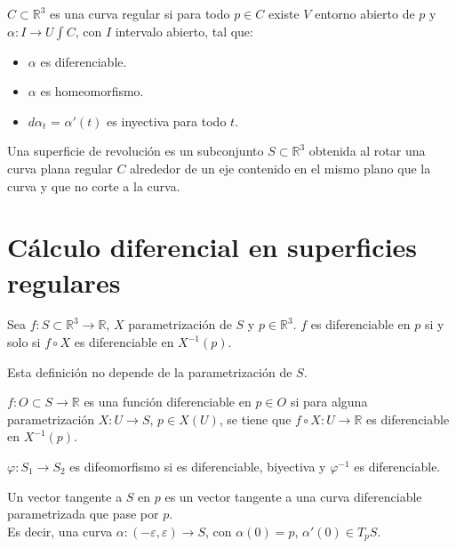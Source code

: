\begin{definition}
    $C \subset \mathbb{R}^3$ es una curva regular si para todo $p \in C$ existe $V$ entorno abierto de $p$ y $\alpha : I \to U \int C$, con $I$ intervalo abierto, tal que:
    \begin{itemize}
        \item $\alpha$ es diferenciable.
        \item $\alpha$ es homeomorfismo.
        \item $d\alpha_t$ = $\alpha'(t)$ es inyectiva para todo $t$.
    \end{itemize}
\end{definition}

\begin{definition}
    Una superficie de revolución es un subconjunto $S \subset \mathbb{R}^3$ obtenida al rotar una curva plana regular $C$ alrededor de un eje contenido en el mismo plano que la curva y que no corte a la curva.
\end{definition}

\section{Cálculo diferencial en superficies regulares}

\begin{definition}
    Sea $f: S \subset \mathbb{R}^3 \to \mathbb{R}$, $X$ parametrización de $S$ y $p \in \mathbb{R}^3$.
    $f$ es diferenciable en $p$ si y solo si $f \circ X$ es diferenciable en $X^{-1}(p)$.
\end{definition}

\begin{remark}
    Esta definición no depende de la parametrización de $S$.
\end{remark}

\begin{definition}
    $f: O \subset S \to \mathbb{R}$ es una función diferenciable en $p \in O$ si para alguna parametrización $X : U \to S$, $p \in X(U)$, se tiene que $f \circ X : U \to \mathbb{R}$ es diferenciable en $X^{-1}(p)$.
\end{definition}

\begin{definition}
    $\varphi : S_1 \to S_2$ es difeomorfismo si es diferenciable, biyectiva y $\varphi^{-1}$ es diferenciable.
\end{definition}

\begin{definition}
    Un vector tangente a $S$ en $p$ es un vector tangente a una curva diferenciable parametrizada que pase por $p$.\\
    Es decir, una curva $\alpha : (-\varepsilon, \varepsilon) \to S$, con $\alpha(0) = p$, $\alpha'(0) \in T_pS$.
\end{definition}

